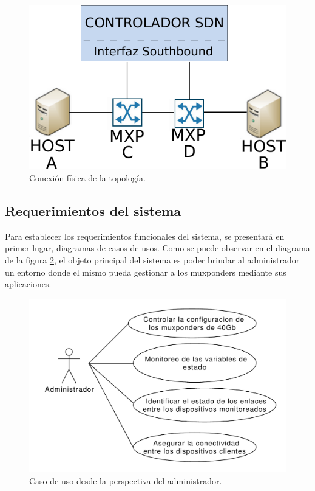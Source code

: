 \begin{figure}[H]
    \centering
    \includegraphics[scale=0.7]{Figures/topologia.pdf}
    \caption{Conexión física de la topología.}
    \label{fig:topologiafis}
  \end{figure}

\subsection{Requerimientos del sistema}

Para establecer los requerimientos funcionales del sistema, se presentará en primer lugar, diagramas de casos de usos. Como se puede observar en el diagrama de la figura \ref{fig:caso_uso_admin}, el objeto principal del sistema es poder brindar al administrador un entorno donde el mismo pueda gestionar a los muxponders mediante sus aplicaciones.

\begin{figure}[H]
    \centering
    \includegraphics[scale=0.55]{Figures/caso_uso_admin.pdf}
    \caption{Caso de uso desde la perspectiva del administrador.}
    \label{fig:caso_uso_admin}
  \end{figure}

